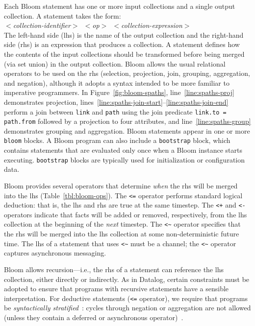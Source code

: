 Each Bloom statement has one or more input collections and a single output
collection.  A statement takes the form: \\ \noindent
\mbox{\hspace{0.25in}\emph{$<$collection-identifier$>$ $<$op$>$
    $<$collection-expression$>$}}\\ \noindent
The left-hand side (lhs) is the name of the output collection and the right-hand
side (rhs) is an expression that produces a collection.  A statement defines how
the contents of the input collections should be transformed before being
merged (via set union) in the output collection. Bloom allows the usual
relational operators to be used on the rhs (selection, projection, join,
grouping, aggregation, and negation), although it adopts a syntax intended to be
more familiar to imperative programmers. In Figure~\ref{fig:bloom-spaths},
line~\ref{line:spaths-proj} demonstrates projection,
lines~\ref{line:spaths-join-start}--\ref{line:spaths-join-end} perform a join
between \texttt{link} and \texttt{path} using the join predicate
\verb+link.to = path.from+ followed by a projection to four attributes, and
line~\ref{line:spaths-group} demonstrates grouping and aggregation. Bloom
statements appear in one or more \texttt{bloom} blocks. A Bloom program can also
include a \texttt{bootstrap} block, which contains statements that are evaluated
only once when a Bloom instance starts executing. \texttt{bootstrap} blocks are
typically used for initialization or configuration data.

Bloom provides several operators that determine \emph{when} the rhs will be
merged into the lhs (Table~\ref{tbl:bloom-ops}). The \verb|<=| operator performs
standard logical deduction: that is, the lhs and rhs are true at the same
timestep. The \verb|<+| and \verb|<-| operators indicate that facts will be
added or removed, respectively, from the lhs collection at the beginning of the
\emph{next} timestep. The \verb+<~+ operator specifies that the rhs will be merged into
the lhs collection at some non-deterministic future time. The lhs of a statement
that uses \verb+<~+ must be a channel; the \verb+<~+ operator captures
asynchronous messaging.

Bloom allows recursion---i.e., the rhs of a statement can reference the lhs
collection, either directly or indirectly. As in Datalog, certain constraints
must be adopted to ensure that programs with recursive statements have a
sensible interpretation. For deductive statements (\verb+<=+ operator), we
require that programs be \emph{syntactically stratified}~\cite{Apt1988}: cycles
through negation or aggregation are not allowed (unless they contain a deferred
or asynchronous operator)~\cite{dedalus}.

